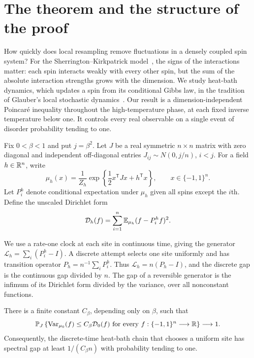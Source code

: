 \section{The theorem and the structure of the proof}\label{sec:introduction}

How quickly does local resampling remove fluctuations in a densely coupled
spin system? For the Sherrington--Kirkpatrick model~\cite{SK1975}, the signs
of the interactions matter: each spin interacts weakly with every other spin,
but the sum of the absolute interaction strengths grows with the dimension.
We study heat-bath dynamics, which updates a spin from its conditional Gibbs
law, in the tradition of Glauber's local stochastic dynamics~\cite{Glauber1963}.
Our result is a dimension-independent Poincar\'e inequality throughout the
high-temperature phase, at each fixed inverse temperature below one. It controls every real observable on a single
event of disorder probability tending to one.

Fix $0<\beta<1$ and put $j=\beta^2$. Let $J$ be a real symmetric
$n\times n$ matrix with zero diagonal and independent off-diagonal entries
$J_{ij}\sim N(0,j/n)$, $i<j$. For a field $h\in\mathbb R^n$, write
\[
 \mu_h(x)=\frac{1}{Z_h}\exp\left\{\frac12x^{\mathsf T}Jx+h^{\mathsf T}x\right\},
 \qquad x\in\{-1,1\}^n.
\]
Let $P_i^h$ denote conditional expectation under $\mu_h$ given all spins
except the $i$th. Define the unscaled Dirichlet form
\begin{equation}\label{eq:dirichlet}
 \mathcal D_h(f)=\sum_{i=1}^n\mathbb E_{\mu_h}(f-P_i^h f)^2.
\end{equation}

We use a rate-one clock at each site in continuous time, giving the
generator $\mathcal L_h=\sum_i(P_i^h-I)$. A discrete attempt selects one
site uniformly and has transition operator $P_h=n^{-1}\sum_iP_i^h$.
Thus $\mathcal L_h=n(P_h-I)$, and the discrete gap is the continuous gap
divided by $n$. The gap of a reversible generator is the infimum of its
Dirichlet form divided by the variance, over all nonconstant functions.

\begin{theorem}\label{thm:main}
There is a finite constant $C_\beta$, depending only on $\beta$, such that
\[
 \mathbb P_J\left\{\operatorname{Var}_{\mu_0}(f)\le C_\beta\mathcal D_0(f)
       \text{ for every }f:\{-1,1\}^n\longrightarrow\mathbb R\right\}
 \longrightarrow1.
\]
Consequently, the discrete-time heat-bath chain that chooses a uniform site
has spectral gap at least $1/(C_\beta n)$ with probability tending to one.
\end{theorem}

